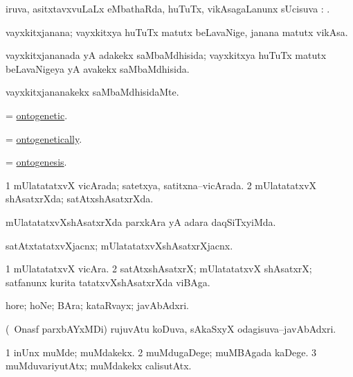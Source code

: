 \bentry
{}
\gl{\sapUpa}
\bmng
iruva, asitxtavxvuLaLx eMbathaRda, huTuTx, vikAsagaLanunx sUcisuva \sapUpa: . 
\emng
\eentry

\bentry
{}
\gl{\nA}
\bmng
vayxkitxjanana; vayxkitxya huTuTx matutx beLavaNige, janana matutx vikAsa. 
\emng
\eentry

\bentry
{}
\gl{\gu}
\bmng
vayxkitxjananada yA adakekx saMbaMdhisida; vayxkitxya huTuTx matutx beLavaNigeya yA avakekx saMbaMdhisida. 
\emng
\eentry

\bentry
{}
\gl{\kirxvi}
\bmng
vayxkitxjananakekx saMbaMdhisidaMte. 
\emng
\eentry

\bentry
{}
\gl{\gu}
\bmng
= \hyperlink{ontogenetic}{ontogenetic}. 
\emng
\eentry

\bentry
{}
\gl{\kirxvi}
\bmng
= \hyperlink{ontogenetically}{ontogenetically}. 
\emng
\eentry

\bentry
{}
\gl{\nA}
\bmng
= \hyperlink{ontogenesis}{ontogenesis}. 
\emng
\eentry

\bentry
{}
\gl{\gu}
\bmng
\bnum
\num{1} mUlatatatxvX vicArada; satetxya, satitxna--vicArada. 
\num{2} mUlatatatxvX shAsatxrXda; satAtxshAsatxrXda. 
\enum
\emng
\eentry

\bentry
{}
\gl{\kirxvi}
\bmng
mUlatatatxvXshAsatxrXda parxkAra yA adara daqSiTxyiMda. 
\emng
\eentry

\bentry
{}
\gl{\nA}
\bmng
satAtxtatatxvXjacnx; mUlatatatxvXshAsatxrXjacnx. 
\emng
\eentry

\bentry
{}
\gl{\nA}
\bmng
\bnum
\num{1} mUlatatatxvX vicAra. 
\num{2} satAtxshAsatxrX; mUlatatatxvX shAsatxrX; satfanunx kurita tatatxvXshAsatxrXda viBAga. 
\enum
\emng
\eentry

\bentry
{}
\gl{\nA}
\bmng
hore; hoNe; BAra; kataRvayx; javAbAdxri. 
\emng

\noindent
\gl{\pagu}
\bmng
{} (\ucAcx\ Onasf parxbAYxMDi) rujuvAtu koDuva, sAkaSxyX odagisuva--javAbAdxri. 
\emng
\eentry

\bentry
{}
\gl{\kirxvi}
\bmng
\bnum
\num{1} inUnx muMde; muMdakekx. 
\num{2} muMdugaDege; muMBAgada kaDege. 
\num{3} muMduvariyutAtx; muMdakekx calisutAtx. 
\enum
\emng
\eentry

